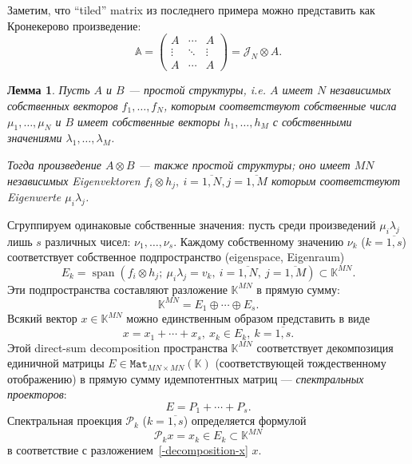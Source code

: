 \documentclass[14pt,a4paper]{extarticle}
\newtheorem{lem}{Лемма}
\theoremstyle{definition}
\begin{document}
Заметим, что ``tiled'' matrix из последнего примера
можно представить как Кронекерово произведение:
\[
    \mathbb{A} =
    \begin{pmatrix}
    A & \cdots & A\\
    \vdots & \ddots & \vdots \\
    A & \cdots & A\end{pmatrix} =
        \mathcal{J}_N\otimes A.
    \]

\begin{lem}
Пусть \( A \) и \( B \) --- простой структуры,
    i.e. \( A \) имеет \( N \) независимых собственных векторов
    \( f_1, \ldots, f_N \),
    которым соответствуют собственные числа \( \mu_1, \ldots, \mu_N \)
    и \( B \) имеет собственные векторы \( h_1, \ldots, h_M \)
    с собственными значениями \( \lambda_1, \ldots, \lambda_M \).

Тогда произведение \( A\otimes B \) --- также простой структуры;
    оно имеет \( MN \) независимых Eigenvektoren \( f_i\otimes h_j,\ i{=}\overline{1,N}, j{=}\overline{1,M} \)
    которым соответствуют Eigenwerte \( \mu_i \lambda_j \).
\end{lem}


Сгруппируем одинаковые собственные значения: пусть среди произведений \( \mu_i
\lambda_j \) лишь \( s \) различных чисел: \( \nu_1, \ldots, \nu_s \).
Каждому собственному значению \( \nu_k \) (\( k{=}\overline{1,s} \)) соответствует
собственное подпространство (eigenspace, Eigenraum)
\[ E_k = \operatorname{span}(f_i\otimes h_j;\ \mu_i\lambda_j = v_k,\ i{=}\overline{1,N},\ j{=}\overline{1,M}) \subset \mathbb{K}^{MN}. \]
Эти подпространства составляют разложение \( \mathbb{K}^{MN} \) в прямую сумму:
    \[ \mathbb{K}^{MN} = E_1 \oplus \cdots \oplus E_s. \]
Всякий вектор \( x\in\mathbb{K}^{MN} \) можно единственным образом представить в виде
    \begin{equation}\label{-decomposition-x}
        x = x_1 + \cdots + x_s,\ x_k\in E_k,\ k=\overline{1,s}.
    \end{equation}
Этой direct-sum decomposition пространства \( \mathbb{K}^{MN} \)
    соответствует декомпозиция единичной матрицы \( E\in \mathtt{Mat}_{MN{\times}MN}(\mathbb{K}) \)
    (соответствующей тождественному отображению)
    в прямую сумму идемпотентных матриц --- \emph{спектральных проекторов}:
    \[
        E = P_1 + \cdots + P_s.
    \]
Спектральная проекция \( \mathcal{P}_k \) (\(k{=}\overline{1,s}\)) определяется формулой
    \[
        \mathcal{P}_k x = x_k \in E_k\subset \mathbb{K}^{MN}
    \]
    в соответствие с разложением~\eqref{-decomposition-x} \( x \).
\end{document}
